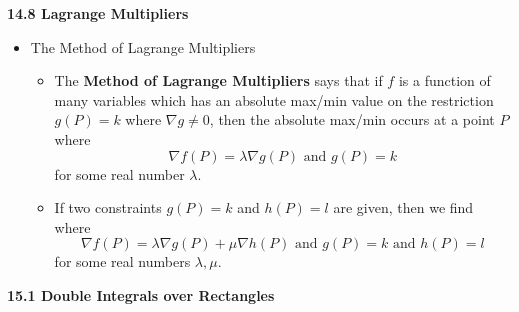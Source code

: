 \documentclass[12pt]{article}
\newcommand{\<}{\left<}
\renewcommand{\>}{\right>}
\begin{document}
\begin{itemize}
  
  
\end{itemize}
  
  \newpage
  
  \centerline{\bf 14.8 Lagrange Multipliers}
  
  \begin{itemize}
  
  \item The Method of Lagrange Multipliers
  
    \begin{itemize}
    \item 
      The \textbf{Method of Lagrange Multipliers} says that if $f$ is a function of many variables which has an absolute max/min value on the restriction $g(P)=k$ where $\nabla g \not= 0$, then the absolute max/min occurs at a point $P$ where 
      \[
        \nabla f(P)=\lambda \nabla g(P) \text{ and } g(P)=k
      \] 
      for some real number $\lambda$.

    \item 
      If two constraints $g(P)=k$ and $h(P)=l$ are given, then we find where
      \[
        \nabla f(P)=\lambda \nabla g(P) + \mu \nabla h(P) \text{ and } g(P)=k \text{ and } h(P)=l
      \]
      for some real numbers $\lambda,\mu$.

    \end{itemize}
    
  
    
  \end{itemize}
  
  \newpage
  
\centerline{\bf 15.1 Double Integrals over Rectangles}
  
\end{document}
